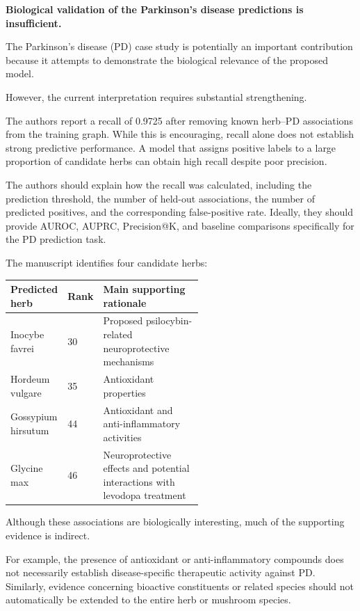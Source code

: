 \documentclass[11pt,american]{article}
\begin{document}
\begin{revresponse}

\end{revresponse}

\begin{revcomment}
\textbf{Biological validation of the Parkinson's disease predictions is insufficient.}

The Parkinson's disease (PD) case study is potentially an important contribution because it attempts to demonstrate the biological relevance of the proposed model.

However, the current interpretation requires substantial strengthening.

The authors report a recall of 0.9725 after removing known herb--PD associations from the training graph. While this is encouraging, recall alone does not establish strong predictive performance. A model that assigns positive labels to a large proportion of candidate herbs can obtain high recall despite poor precision.

The authors should explain how the recall was calculated, including the prediction threshold, the number of held-out associations, the number of predicted positives, and the corresponding false-positive rate. Ideally, they should provide AUROC, AUPRC, Precision@K, and baseline comparisons specifically for the PD prediction task.

The manuscript identifies four candidate herbs:

\vspace{1mm}
\begin{tabular}{@{}llp{0.55\linewidth}@{}}
\toprule
Predicted herb & Rank & Main supporting rationale \\
\midrule
Inocybe favrei & 30 & Proposed psilocybin-related neuroprotective mechanisms \\
Hordeum vulgare & 35 & Antioxidant properties \\
Gossypium hirsutum & 44 & Antioxidant and anti-inflammatory activities \\
Glycine max & 46 & Neuroprotective effects and potential interactions with levodopa treatment \\
\bottomrule
\end{tabular}
\vspace{1mm}

Although these associations are biologically interesting, much of the supporting evidence is indirect.

For example, the presence of antioxidant or anti-inflammatory compounds does not necessarily establish disease-specific therapeutic activity against PD. Similarly, evidence concerning bioactive constituents or related species should not automatically be extended to the entire herb or mushroom species.


\end{revcomment}
\end{document}

